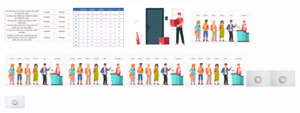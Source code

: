 \begin{escolha}
\begin{escolha}
{{{{\includegraphics[width=1.10972in,height=0.74212in]{media/image109.png}\includegraphics[width=1.01042in,height=0.67572in]{media/image111.png}\includegraphics[width=1.09268in,height=0.73073in]{media/image112.png}\includegraphics[width=1.04264in,height=0.69727in]{media/image113.png}\includegraphics[width=1.04264in,height=0.69727in]{media/image113.png}\includegraphics[width=1.04264in,height=0.69727in]{media/image113.png}\includegraphics[width=1.04264in,height=0.69727in]{media/image113.png}\includegraphics[width=1.04264in,height=0.69727in]{media/image113.png}\includegraphics[width=0.41851in,height=0.40455in]{media/image168.png}\includegraphics[width=0.41851in,height=0.40455in]{media/image168.png}\includegraphics[width=0.34170in,height=0.31303in]{media/image169.jpeg}}}}}
\end{escolha}
\end{escolha}
